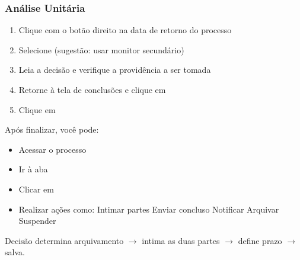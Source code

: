\documentclass[letterpaper,10pt,brazil]{sphinxmanual}
\begin{document}
\subsubsection{Análise Unitária}
\label{\detokenize{projud_07_analisejuntada_multiplaeunitariaconclusos:analise-unitaria}}\begin{enumerate}
%
\item {} 
\sphinxAtStartPar
Clique com o botão direito na data de retorno do processo

\item {} 
\sphinxAtStartPar
Selecione  (sugestão: usar monitor secundário)

\item {} 
\sphinxAtStartPar
Leia a decisão e verifique a providência a ser tomada

\item {} 
\sphinxAtStartPar
Retorne à tela de conclusões e clique em 

\item {} 
\sphinxAtStartPar
Clique em 

\end{enumerate}

\sphinxAtStartPar
Após finalizar, você pode:
\begin{itemize}
\item {} 
\sphinxAtStartPar
Acessar o processo

\item {} 
\sphinxAtStartPar
Ir à aba 

\item {} 
\sphinxAtStartPar
Clicar em 

\item {} 
\sphinxAtStartPar
Realizar ações como:
\sphinxhyphen{} Intimar partes
\sphinxhyphen{} Enviar concluso
\sphinxhyphen{} Notificar
\sphinxhyphen{} Arquivar
\sphinxhyphen{} Suspender

\end{itemize}

\sphinxAtStartPar
{} Decisão determina arquivamento \(\rightarrow\) intima as duas partes \(\rightarrow\) define prazo \(\rightarrow\) salva.
\end{document}
